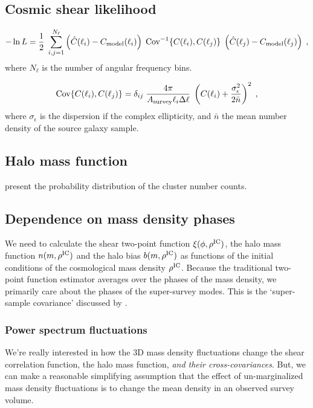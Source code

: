 \documentclass[preprint]{aastex}
\newcommand{\skyangle}{\phi}
\newcommand{\rhoic}{\rho^{\rm IC}}
\begin{document}
\subsection{Cosmic shear likelihood}

\begin{equation}
- \ln L = \frac{1}{2}\; \sum_{i,j=1}^{N_\ell} \left(  \hat{C}(\ell_i) - C_{\rm model}(\ell_i) \right)\; {\rm Cov}^{-1}\{  C(\ell_i), C(\ell_j) \}\; \left(  \hat{C}(\ell_j) - C_{\rm model}(\ell_j) \right)\;,
\end{equation}
where $N_\ell$ is the number of angular frequency bins.

\begin{equation}
{\rm Cov}\{  C(\ell_i), C(\ell_j) \}= \delta_{ij}\; \frac{4 \pi}{A_{\rm survey} \ell_i \Delta \ell}\; \left( C(\ell_i) + \frac{\sigma_\epsilon^2}{2 \bar{n}} \right)^2\;,
\end{equation}
where $\sigma_\epsilon$ is the dispersion if the complex ellipticity, and $\bar{n}$ the mean number density of the source galaxy sample.


\subsection{Halo mass function}
\citet{lima2004} present the probability distribution of the cluster number counts.

\subsection{Dependence on mass density phases} %
\label{sub:dependence_on_mass_density_phases}
We need to calculate the shear two-point function $\xi(\skyangle, \rhoic)$, 
the halo mass function $n(m, \rhoic)$
and the halo bias $b(m, \rhoic)$ as functions of the initial conditions of the 
cosmological mass density $\rhoic$. 
Because the traditional two-point function estimator averages over the phases 
of the mass density, we primarily care about the phases of the super-survey 
modes. This is the `super-sample covariance' discussed by 
\citet{takada2013}.

\subsubsection{Power spectrum fluctuations}
We're really interested in how the 3D mass density fluctuations change the
shear correlation function, the halo mass function, \emph{and their 
cross-covariances}. But, we can make a reasonable simplifying assumption that 
the effect of un-marginalized mass density fluctuations is to change the mean density 
in an observed survey volume. 
\end{document}
